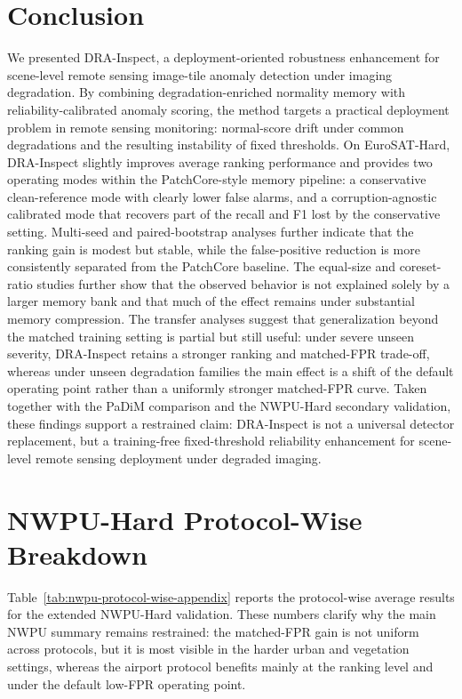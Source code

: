 \documentclass[remotesensing,article,submit,pdftex,moreauthors]{Definitions/mdpi}
\begin{document}
\section{Conclusion}
We presented DRA-Inspect, a deployment-oriented robustness enhancement for scene-level remote sensing image-tile anomaly detection under imaging degradation. By combining degradation-enriched normality memory with reliability-calibrated anomaly scoring, the method targets a practical deployment problem in remote sensing monitoring: normal-score drift under common degradations and the resulting instability of fixed thresholds. On EuroSAT-Hard, DRA-Inspect slightly improves average ranking performance and provides two operating modes within the PatchCore-style memory pipeline: a conservative clean-reference mode with clearly lower false alarms, and a corruption-agnostic calibrated mode that recovers part of the recall and F1 lost by the conservative setting. Multi-seed and paired-bootstrap analyses further indicate that the ranking gain is modest but stable, while the false-positive reduction is more consistently separated from the PatchCore baseline. The equal-size and coreset-ratio studies further show that the observed behavior is not explained solely by a larger memory bank and that much of the effect remains under substantial memory compression. The transfer analyses suggest that generalization beyond the matched training setting is partial but still useful: under severe unseen severity, DRA-Inspect retains a stronger ranking and matched-FPR trade-off, whereas under unseen degradation families the main effect is a shift of the default operating point rather than a uniformly stronger matched-FPR curve. Taken together with the PaDiM comparison and the NWPU-Hard secondary validation, these findings support a restrained claim: DRA-Inspect is not a universal detector replacement, but a training-free fixed-threshold reliability enhancement for scene-level remote sensing deployment under degraded imaging.

\appendixstart
\appendix
\renewcommand{\theHsection}{appendix.\thesection}
\renewcommand{\theHtable}{appendix.\thetable}

\section{NWPU-Hard Protocol-Wise Breakdown}
Table~\ref{tab:nwpu-protocol-wise-appendix} reports the protocol-wise average results for the extended NWPU-Hard validation. These numbers clarify why the main NWPU summary remains restrained: the matched-FPR gain is not uniform across protocols, but it is most visible in the harder urban and vegetation settings, whereas the airport protocol benefits mainly at the ranking level and under the default low-FPR operating point.
\end{document}
